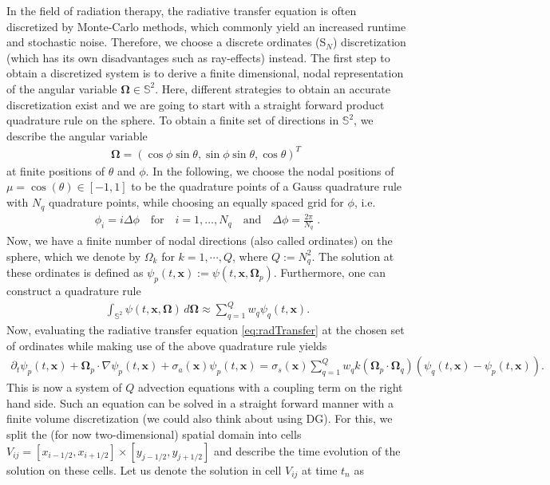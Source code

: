 \documentclass[10pt,a4paper]{article}
\begin{document}
In the field of radiation therapy, the radiative transfer equation is often discretized by Monte-Carlo methods, which commonly yield an increased runtime and stochastic noise. Therefore, we choose a discrete ordinates (S$_N$) discretization (which has its own disadvantages such as ray-effects) instead. The first step to obtain a discretized system is to derive a finite dimensional, nodal representation of the angular variable $\bm\Omega\in\mathbb{S}^2$. Here, different strategies to obtain an accurate discretization exist and we are going to start with a straight forward product quadrature rule on the sphere. To obtain a finite set of directions in $\mathbb{S}^2$, we describe the angular variable
\begin{align*}
\bm\Omega = (\cos\phi \sin \theta, \sin\phi \sin \theta, \cos \theta)^T\;
\end{align*}
at finite positions of $\theta$ and $\phi$. In the following, we choose the nodal positions of $\mu = \cos(\theta) \in[-1,1]$ to be the quadrature points of a Gauss quadrature rule with $N_q$ quadrature points, while choosing an equally spaced grid for $\phi$, i.e.
\begin{align*}
\phi_i = i \Delta\phi \quad \text{for} \quad i=1,\ldots,N_q \quad \text{and} 
\quad \Delta\phi = \frac{2\pi}{N_q}\;.
\end{align*}
Now, we have a finite number of nodal directions (also called ordinates) on the sphere, which we denote by $\Omega_k$ for $k = 1,\cdots, Q$, where $Q:=N_q^2$. The solution at these ordinates is defined as $\psi_p(t,\bm x):=\psi(t,\bm x,\bm\Omega_p)$. Furthermore, one can construct a quadrature rule
\begin{align*}
\int_{\mathbb{S}^2} \psi(t,\bm x,\bm\Omega)\,d\bm\Omega \approx \sum_{q=1}^Q w_q \psi_q(t,\bm x).
\end{align*}
Now, evaluating the radiative transfer equation \eqref{eq:radTransfer} at the chosen set of ordinates while making use of the above quadrature rule yields
\begin{align*}
\partial_t \psi_p(t,\bm x) + \bm\Omega_p\cdot\nabla \psi_p(t,\bm x) + \sigma_a(\bm x)\psi_p(t,\bm x) = \sigma_s(\bm x) \sum_{q=1}^Q w_q k(\bm\Omega_p\cdot\bm\Omega_q)\left(\psi_q(t,\bm x)-\psi_p(t,\bm x)\right).
\end{align*}
This is now a system of $Q$ advection equations with a coupling term on the right hand side. Such an equation can be solved in a straight forward manner with a finite volume discretization (we could also think about using DG). For this, we split the (for now two-dimensional) spatial domain into cells $V_{ij} = [x_{i-1/2},x_{i+1/2}]\times[y_{j-1/2},y_{j+1/2}]$ and describe the time evolution of the solution on these cells. Let us denote the solution in cell $V_{ij}$ at time $t_n$ as
\end{document}
